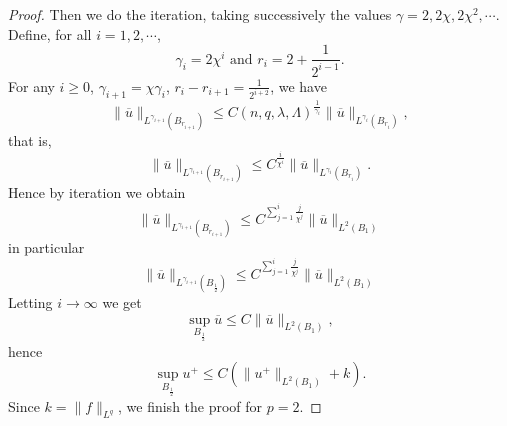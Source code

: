 \begin{proof}
 Then we do the iteration, taking successively the values $\gamma=2,2\chi,2\chi^2,\cdots$. Define, for all $i=1,2,\cdots$,
 \[
 \gamma_i=2\chi^{i}\text{ and }r_i=2+\frac{1}{2^{i-1}}.
 \]
 For any $i\ge 0$, $\gamma_{i+1}=\chi\gamma_i$, $r_{i}-r_{i+1}=\frac{1}{2^{i+2}}$, we have
 \[
   \|\overline{u}\|_{L^{\gamma_{i+1}}(B_{r_{i+1}})}\le C\left( n,q,\lambda,\Lambda \right) ^{\frac{1}{\gamma_i}}\|\overline{u}\|_{L^{\gamma_i}\left( B_{r_i} \right) },
 \] 
 that is,
 \[
   \|\overline{u}\|_{L^{\gamma_{i+1}}(B_{r_{i+1}})}\le  C^{\frac{i}{\chi^{i}}}\|\overline{u}\|_{L^{\gamma_i}(B_{r_i})}.
 \] 
Hence by iteration we obtain 
\[
  \|\overline{u}\|_{L^{\gamma_{i+1}}\left( B_{r_{i+1}} \right) }\le C^{\sum_{j=1}^{i}\frac{j}{\chi^{j}}}\|\overline{u}\|_{L^{2}\left( B_1 \right) }
\] 
in particular
\[
  \|\overline{u}\|_{L^{\gamma_{i+1}}\left( B_{\frac{1}{2}} \right) }\le C^{\sum_{j=1}^{i}\frac{j}{\chi^{j}}}\|\overline{u}\|_{L^{2}\left( B_1 \right) }
\] 
Letting $i\to \infty$ we get 
\[
  \sup_{B_{\frac{1}{2}}}\overline{u}\le C\|\overline{u}\|_{L^2\left( B_1 \right) },
\] 
hence
\[
  \sup_{B_{\frac{1}{2}}}u^{+}\le C\left( \|u^{+}\|_{L^2\left( B_1 \right) }+k \right). 
\] 
Since $k=\|f\|_{L^{q}}$, we finish the proof for $p=2$.

\end{proof}
